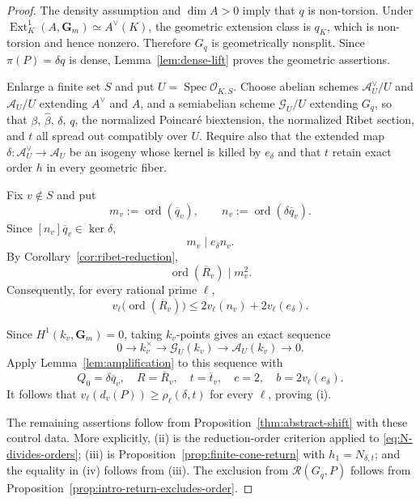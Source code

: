 \documentclass[10pt,a4paper]{amsart}
\newcommand{\Ext}{\operatorname{Ext}}
\newcommand{\Gm}{\mathbf G_m}
\newcommand{\Spec}{\operatorname{Spec}}
\newcommand{\cO}{\mathcal O}
\newcommand{\ord}{\operatorname{ord}}
\begin{document}
\begin{proof}
The density assumption and $\dim A>0$ imply that $q$ is non-torsion.  Under
$\Ext_K^1(A,\Gm)\simeq A^\vee(K)$, the geometric extension class is
$q_{\overline K}$, which is non-torsion and hence nonzero.  Therefore $G_q$ is
geometrically nonsplit.  Since $\pi(P)=\delta q$ is dense,
Lemma~\ref{lem:dense-lift} proves the geometric assertions.

Enlarge a finite set $S$ and put $U=\Spec\cO_{K,S}$.  Choose abelian schemes
$\mathcal A_U^\vee/U$ and $\mathcal A_U/U$ extending $A^\vee$ and $A$, and a
semiabelian scheme $\mathcal G_U/U$ extending $G_q$, so that $\beta$,
$\widehat\beta$, $\delta$, $q$, the normalized Poincar\'e biextension, the
normalized Ribet section, and $t$ all spread out compatibly over $U$.  Require
also that the extended map
$\delta:\mathcal A_U^\vee\to\mathcal A_U$ be an isogeny whose kernel is killed
by $e_\delta$ and that $t$ retain exact order $h$ in every geometric fiber.

Fix $v\notin S$ and put
\[
 m_v:=\ord(\overline q_v),
 \qquad
 n_v:=\ord(\delta\overline q_v).
\]
Since $[n_v]\overline q_v\in\ker\delta$,
\begin{equation}\label{eq:m-divides-en}
 m_v\mid e_\delta n_v.
\end{equation}
By Corollary~\ref{cor:ribet-reduction},
\begin{equation}\label{eq:R-order-m2}
 \ord(\overline R_v)\mid m_v^2.
\end{equation}
Consequently, for every rational prime $\ell$,
\begin{equation}\label{eq:R-vell-bound}
 v_\ell\bigl(\ord(\overline R_v)\bigr)
 \le2v_\ell(n_v)+2v_\ell(e_\delta).
\end{equation}

Since $H^1(k_v,\Gm)=0$, taking $k_v$-points gives an exact sequence
\[
 0\longrightarrow k_v^\times
 \longrightarrow\mathcal G_U(k_v)
 \longrightarrow\mathcal A_U(k_v)
 \longrightarrow0.
\]
Apply Lemma~\ref{lem:amplification} to this sequence
with
\[
 Q_0=\delta\overline q_v,
 \quad R=\overline R_v,
 \quad t=\overline t_v,
 \quad c=2,
 \quad b=2v_\ell(e_\delta).
\]
It follows that $v_\ell(d_v(P))\ge\rho_\ell(\delta,t)$ for every $\ell$,
proving (i).

The remaining assertions follow from Proposition~\ref{thm:abstract-shift} with these
control data.  More explicitly, (ii) is the reduction-order criterion applied
to \eqref{eq:N-divides-orders}; (iii) is
Proposition~\ref{prop:finite-cone-return} with $h_1=N_{\delta,t}$; and the equality in
(iv) follows from (iii).  The exclusion from $\mathscr R(G_q,P)$ follows from
Proposition~\ref{prop:intro-return-excludes-order}.
\end{proof}
\end{document}
